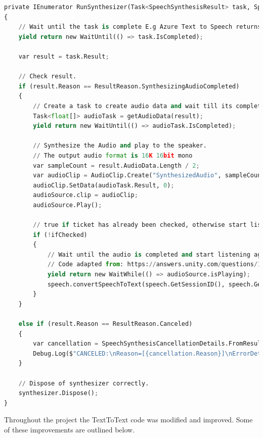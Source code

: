 \begin{lstlisting}[caption={Text to Speech - Asynchronous Audio Processing},label={lst:TTS3},language=python]
private IEnumerator RunSynthesizer(Task<SpeechSynthesisResult> task, SpeechConfig config, SpeechSynthesizer synthesizer)
{
    // Wait until the task is complete E.g Azure Text to Speech returns a result.
    yield return new WaitUntil(() => task.IsCompleted);

    var result = task.Result;
    
    // Check result.
    if (result.Reason == ResultReason.SynthesizingAudioCompleted)
    {
        // Create a task to create audio data and wait till its completed.
        Task<float[]> audioTask = getAudioData(result);
        yield return new WaitUntil(() => audioTask.IsCompleted);

        // Synthesize the Audio and play to the speaker.
        // The output audio format is 16K 16bit mono
        var sampleCount = result.AudioData.Length / 2;
        var audioClip = AudioClip.Create("SynthesizedAudio", sampleCount, 1, 16000, false);
        audioClip.SetData(audioTask.Result, 0);
        audioSource.clip = audioClip;
        audioSource.Play();
        
        // true if ticket has already been checked, otherwise start listening again until ticket has been checked.
        if (!ifChecked)
        {
            // Wait until the audio is completed and start listening again.
            // Code adapted from: https://answers.unity.com/questions/1111236/wait-for-audio-to-finish-and-then-load-scene.html
            yield return new WaitWhile(() => audioSource.isPlaying);
            speech.convertSpeechToText(speech.GetSessionID(), speech.GetPersona(), speech.GetVoiceName());
        }
    }

    else if (result.Reason == ResultReason.Canceled)
    {
        var cancellation = SpeechSynthesisCancellationDetails.FromResult(result);
        Debug.Log($"CANCELED:\nReason=[{cancellation.Reason}]\nErrorDetails=[{cancellation.ErrorDetails}]");
    }

    // Dispose of synthesizer correctly.
    synthesizer.Dispose();
}
\end{lstlisting}

\par
\medskip

Throughout the project the TextToText code was modified and improved. Some of these improvements are outlined below.

